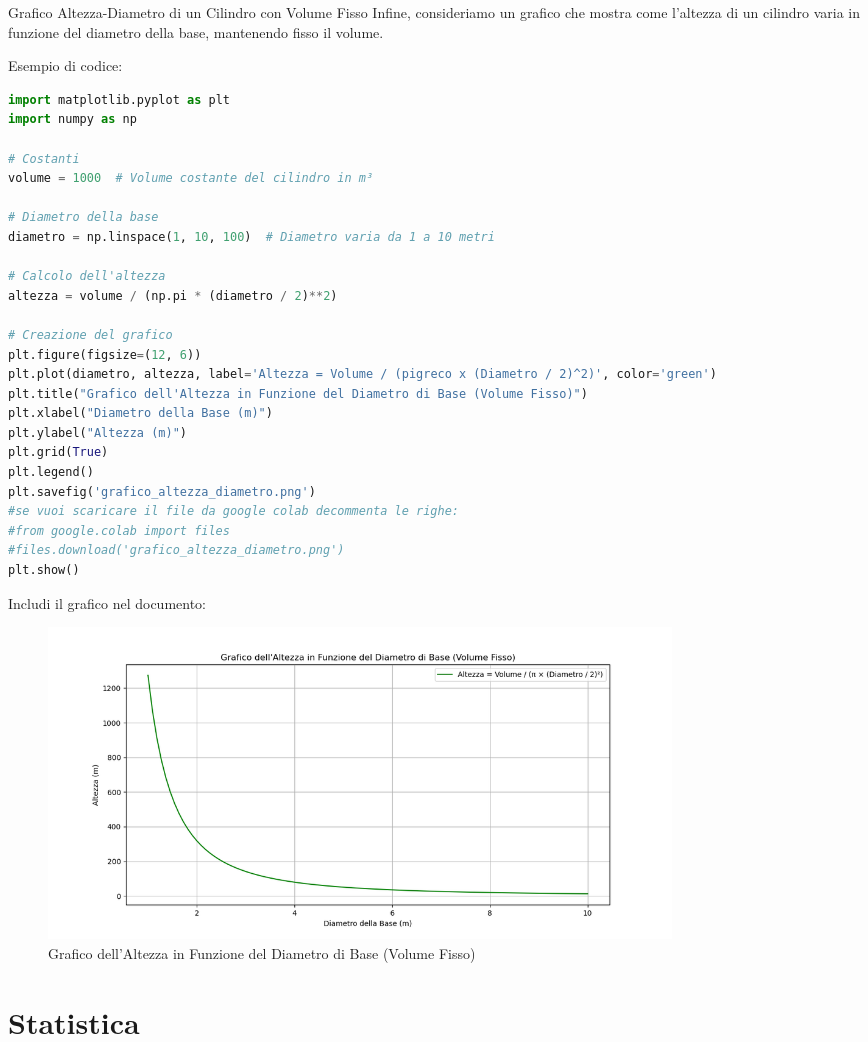 \documentclass[12pt,a4paper,oneside]{book}
\makeatletter
\renewcommand{\subsection}{\@startsection {subsection}{2}{\z@}
{-3ex \@plus -0.1ex \@minus -.4ex}
{0.5ex \@plus.2ex }
{\color[rgb]{0.141,0.596,0.749}\normalfont\sffamily\bfseries}}
\theoremstyle{esercizio}
\makeatother
\begin{document}
\subsection{Grafico Altezza-Diametro di un Cilindro con Volume Fisso}
Infine, consideriamo un grafico che mostra come l'altezza di un cilindro varia in funzione del diametro della base, mantenendo fisso il volume.

Esempio di codice:
\begin{lstlisting}[language=Python]
import matplotlib.pyplot as plt
import numpy as np

# Costanti
volume = 1000  # Volume costante del cilindro in m³

# Diametro della base
diametro = np.linspace(1, 10, 100)  # Diametro varia da 1 a 10 metri

# Calcolo dell'altezza
altezza = volume / (np.pi * (diametro / 2)**2)

# Creazione del grafico
plt.figure(figsize=(12, 6))
plt.plot(diametro, altezza, label='Altezza = Volume / (pigreco x (Diametro / 2)^2)', color='green')
plt.title("Grafico dell'Altezza in Funzione del Diametro di Base (Volume Fisso)")
plt.xlabel("Diametro della Base (m)")
plt.ylabel("Altezza (m)")
plt.grid(True)
plt.legend()
plt.savefig('grafico_altezza_diametro.png')
#se vuoi scaricare il file da google colab decommenta le righe:
#from google.colab import files
#files.download('grafico_altezza_diametro.png')
plt.show()
\end{lstlisting}

Includi il grafico nel documento:
\begin{figure}[h!]
    \centering
    \includegraphics[width=0.8\textwidth]{grafico_altezza_diametro.png}
    \caption{Grafico dell'Altezza in Funzione del Diametro di Base (Volume Fisso)}
    \label{fig:altezza_diametro}
\end{figure}
\chapter{Statistica}
\end{document}
